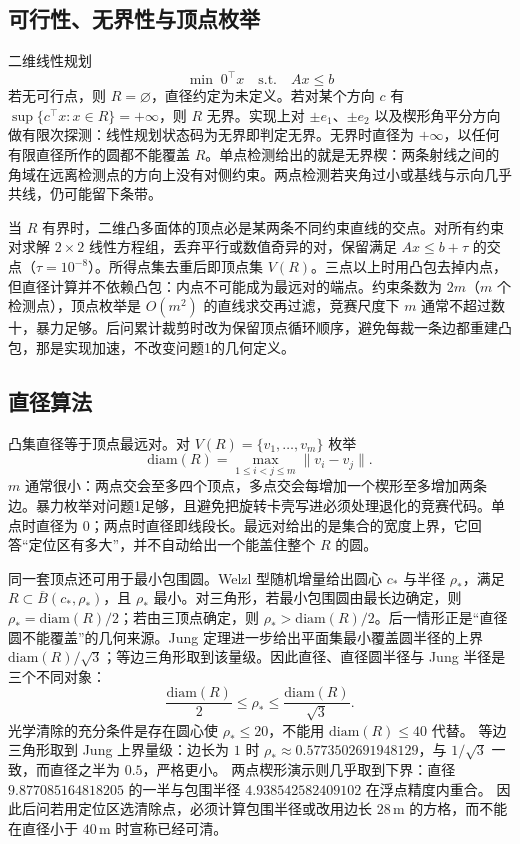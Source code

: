 \subsection{可行性、无界性与顶点枚举}

二维线性规划
\begin{equation}
\min\; 0^\top x\quad\mathrm{s.t.}\quad Ax\le b
\end{equation}
若无可行点，则 $R=\varnothing$，直径约定为未定义。若对某个方向 $c$ 有 $\sup\{c^\top x:x\in R\}=+\infty$，则 $R$ 无界。实现上对 $\pm e_1$、$\pm e_2$ 以及楔形角平分方向做有限次探测：线性规划状态码为无界即判定无界。无界时直径为 $+\infty$，以任何有限直径所作的圆都不能覆盖 $R$。单点检测给出的就是无界楔：两条射线之间的角域在远离检测点的方向上没有对侧约束。两点检测若夹角过小或基线与示向几乎共线，仍可能留下条带。

当 $R$ 有界时，二维凸多面体的顶点必是某两条不同约束直线的交点。对所有约束对求解 $2\times 2$ 线性方程组，丢弃平行或数值奇异的对，保留满足 $Ax\le b+\tau$ 的交点（$\tau=10^{-8}$）。所得点集去重后即顶点集 $V(R)$。三点以上时用凸包去掉内点，但直径计算并不依赖凸包：内点不可能成为最远对的端点。约束条数为 $2m$（$m$ 个检测点），顶点枚举是 $O(m^2)$ 的直线求交再过滤，竞赛尺度下 $m$ 通常不超过数十，暴力足够。后问累计裁剪时改为保留顶点循环顺序，避免每裁一条边都重建凸包，那是实现加速，不改变问题1的几何定义。

\subsection{直径算法}

凸集直径等于顶点最远对。对 $V(R)=\{v_1,\ldots,v_m\}$ 枚举
\begin{equation}
\mathrm{diam}(R)=\max_{1\le i<j\le m}\|v_i-v_j\|.
\end{equation}
$m$ 通常很小：两点交会至多四个顶点，多点交会每增加一个楔形至多增加两条边。暴力枚举对问题1足够，且避免把旋转卡壳写进必须处理退化的竞赛代码。单点时直径为 $0$；两点时直径即线段长。最远对给出的是集合的宽度上界，它回答“定位区有多大”，并不自动给出一个能盖住整个 $R$ 的圆。

同一套顶点还可用于最小包围圆。Welzl 型随机增量给出圆心 $c_\ast$ 与半径 $\rho_\ast$，满足 $R\subset \overline{B}(c_\ast,\rho_\ast)$，且 $\rho_\ast$ 最小。对三角形，若最小包围圆由最长边确定，则 $\rho_\ast=\mathrm{diam}(R)/2$；若由三顶点确定，则 $\rho_\ast>\mathrm{diam}(R)/2$。后一情形正是“直径圆不能覆盖”的几何来源。Jung 定理进一步给出平面集最小覆盖圆半径的上界 $\mathrm{diam}(R)/\sqrt{3}$；等边三角形取到该量级。因此直径、直径圆半径与 Jung 半径是三个不同对象：
\begin{equation}
\frac{\mathrm{diam}(R)}{2}\le\rho_\ast\le\frac{\mathrm{diam}(R)}{\sqrt{3}}.
\end{equation}
光学清除的充分条件是存在圆心使 $\rho_\ast\le 20$，不能用 $\mathrm{diam}(R)\le 40$ 代替。
等边三角形取到 Jung 上界量级：边长为 $1$ 时 $\rho_\ast\approx 0.5773502691948129$，与 $1/\sqrt{3}$ 一致，而直径之半为 $0.5$，严格更小。
两点楔形演示则几乎取到下界：直径 $9.877085164818205$ 的一半与包围半径 $4.938542582409102$ 在浮点精度内重合。
因此后问若用定位区选清除点，必须计算包围半径或改用边长 $28\,\mathrm{m}$ 的方格，而不能在直径小于 $40\,\mathrm{m}$ 时宣称已经可清。

